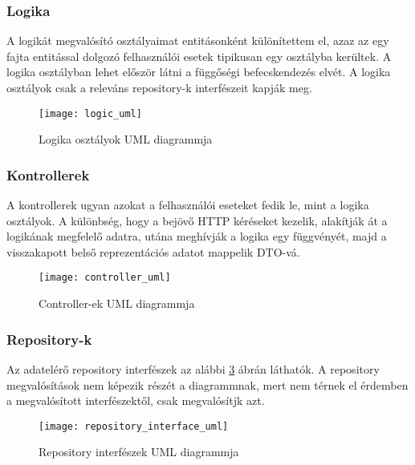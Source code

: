\clearpage

\subsubsection{Logika}
A logikát megvalósító osztályaimat entitásonként különítettem el, azaz az egy fajta entitással dolgozó felhasználói esetek tipikusan egy osztályba kerültek. A logika osztályban lehet először látni a függőségi befecskendezés elvét. A logika osztályok csak a releváns repository-k interfészeit kapják meg.

\begin{figure}[H]
	\centering
	\texttt{[image: logic\_uml]}
	\caption{Logika osztályok UML diagrammja}
	\label{fig:logic}
\end{figure}

\clearpage

\subsubsection{Kontrollerek}

A kontrollerek ugyan azokat a felhasználói eseteket fedik le, mint a logika osztályok. A különbség, hogy a bejövő HTTP kéréseket kezelik, alakítják át a logikának megfelelő adatra, utána meghívják a logika egy függvényét, majd a visszakapott belső reprezentációs adatot mappelik DTO-vá.

\begin{figure}[H]
	\centering
	\texttt{[image: controller\_uml]}
	\caption{Controller-ek UML diagrammja}
	\label{fig:controllers}
\end{figure}

\clearpage

\subsubsection{Repository-k}

Az adatelérő repository interfészek az alábbi \ref{fig:repoInterfaces} ábrán láthatók.
A repository megvalósítások nem képezik részét a diagrammnak, mert nem térnek el érdemben a megvalósított interfészektől, csak megvalósítjk azt.

\begin{figure}[H]
	\centering
	\texttt{[image: repository\_interface\_uml]}
	\caption{Repository interfészek UML diagrammja}
	\label{fig:repoInterfaces}
\end{figure}

